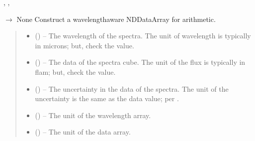 \documentclass[letterpaper,11pt,english]{sphinxmanual}
\begin{document}
\begin{savenotes}
\begin{fulllineitems}
\begin{savenotes}
\begin{fulllineitems}
{{{\begin{footnote}[44]\sphinxAtStartFootnote
{}
%
\end{footnote}}}, , }{{ $\rightarrow$ None}}
\pysigstopsignatures
\sphinxAtStartPar
Construct a wavelength\sphinxhyphen{}aware NDDataArray for arithmetic.
\begin{quote}\begin{description}
\begin{itemize}
\item {} 
\sphinxAtStartPar
{} () – The wavelength of the spectra. The unit of wavelength is typically
in microns; but, check the  value.

\item {} 
\sphinxAtStartPar
{} () – The data of the spectra cube. The unit of the flux is typically
in flam; but, check the  value.

\item {} 
\sphinxAtStartPar
{} () – The uncertainty in the data of the spectra. The unit of the
uncertainty is the same as the data value; per .

\item {} 
\sphinxAtStartPar
{} () – The unit of the wavelength array.

\item {} 
\sphinxAtStartPar
{} () – The unit of the data array.


\end{itemize}
\end{description}
\end{quote}
\end{fulllineitems}
\end{savenotes}
\end{fulllineitems}
\end{savenotes}
\end{document}
